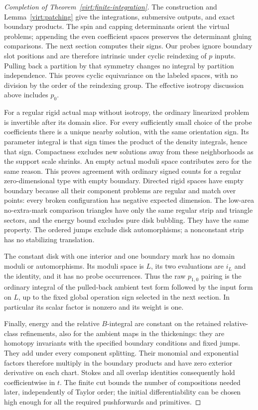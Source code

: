 \documentclass[11pt]{article}
\theoremstyle{definition}
\theoremstyle{remark}
\numberwithin{equation}{section}
\begin{document}
\begin{proof}[Completion of Theorem~\ref{virt:finite-integration}]
The construction and Lemma~\ref{virt:patching} give the integrations,
submersive outputs, and exact boundary products.  The spin and capping
determinants orient the virtual problems; appending the even coefficient
spaces preserves the determinant gluing comparisons.  The next section
computes their signs.  Our probes ignore boundary slot positions and
are therefore intrinsic under cyclic reindexing of $p$ inputs.  Pulling
back a partition by that symmetry changes no integral by partition
independence.  This proves cyclic equivariance on the labeled spaces,
with no division by the order of the reindexing group.  The effective
isotropy discussion above includes $p_0$.

For a regular rigid actual map without isotropy, the ordinary linearized
problem is invertible after its domain slice.  For every sufficiently
small choice of the probe coefficients there is a unique nearby
solution, with the same orientation sign.  Its parameter integral is
that sign times the product of the density integrals, hence that sign.
Compactness excludes new solutions away from these neighborhoods as the
support scale shrinks.  An empty actual moduli space contributes zero
for the same reason.  This proves agreement with ordinary signed counts
for a regular zero-dimensional type with empty boundary.  Directed
rigid spaces have empty boundary because all their component problems
are regular and match over points: every broken configuration has
negative expected dimension.  The low-area no-extra-mark comparison
triangles have only the same regular strip and triangle sectors, and
the energy bound excludes pure disk bubbling.  They have the same
property.  The ordered jumps exclude disk automorphisms; a nonconstant
strip has no stabilizing translation.

The constant disk with one interior and one boundary mark has no domain
moduli or automorphisms.  Its moduli space is $L$, its two evaluations
are $i_L$ and the identity, and it has no probe occurrences.  Thus the
raw $p_{1,0}$ pairing is the ordinary integral of the pulled-back ambient
test form followed by the input form on $L$, up to the fixed global
operation sign selected in the next section.  In particular its scalar
factor is nonzero and its weight is one.

Finally, energy and the relative $B$-integral are constant on the retained
relative-class refinements, also for the ambient maps in the
thickenings: they are homotopy invariants with the specified boundary
conditions and fixed jumps.  They add under every component splitting.
Their monomial and exponential factors therefore multiply in the
boundary products and have zero exterior derivative on each chart.
Stokes and all overlap identities consequently hold coefficientwise in
$t$.  The finite cut bounds the number of compositions needed later,
independently of Taylor order; the initial differentiability can be
chosen high enough for all the required pushforwards and primitives.
\end{proof}
\end{document}
